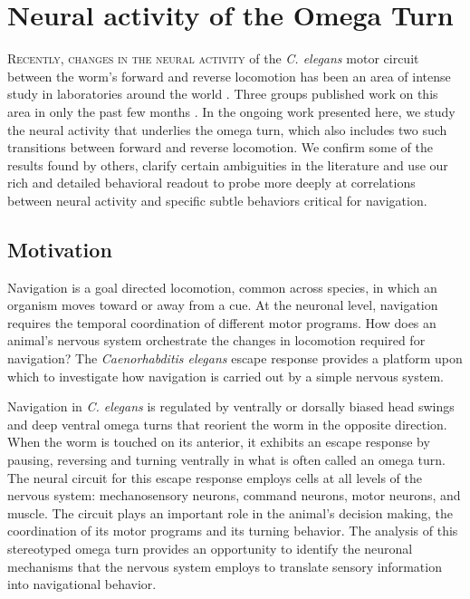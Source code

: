 \chapter{Neural activity of the Omega Turn}\label{chapter:omegaTurn}



\lettrine{R}{ecently, changes in the neural activity} of the  \textit{C. elegans}  motor circuit between  the worm's forward and reverse locomotion has been an area of intense study in laboratories around the world \citep{piggott_neural_2011, faumont_image-free_2011, kawano_imbalancing_2011, ben_arous_automated_2010}.
Three groups published work on this area in only the past few months \citep{piggott_neural_2011, faumont_image-free_2011, kawano_imbalancing_2011}. In the ongoing work presented here, we study the neural activity that underlies the omega turn, which also includes two such transitions between  forward and reverse locomotion. We confirm some of the results found by others,  clarify certain ambiguities in the literature and use our rich and detailed behavioral readout to probe more deeply at correlations between  neural activity and specific subtle behaviors critical for navigation.


\section{Motivation}

Navigation is a goal directed locomotion, common across species, in which an organism moves toward or away from a cue.  At the neuronal level, navigation requires the temporal coordination of different motor programs.  How does an animal's nervous system orchestrate the changes in locomotion required for navigation? The \textit{Caenorhabditis elegans} escape response provides a platform upon which to investigate how navigation is carried out by a simple nervous system.  

Navigation in  \textit{C. elegans} is regulated by ventrally or dorsally biased head swings \citep{iino_parallel_2009} and deep ventral omega turns that reorient the worm in the opposite direction.  When the worm is touched on its anterior, it exhibits an escape response by pausing, reversing and turning ventrally in what is often called an omega turn.  The neural circuit for this escape response employs cells at all levels of the nervous system: mechanosensory neurons, command neurons, motor neurons, and muscle. The circuit plays an important role in the animal's decision making, the coordination of its motor programs and its turning behavior. 
The analysis of this stereotyped omega turn provides an opportunity to identify the  neuronal mechanisms that the nervous system employs to translate sensory information into navigational behavior.  


